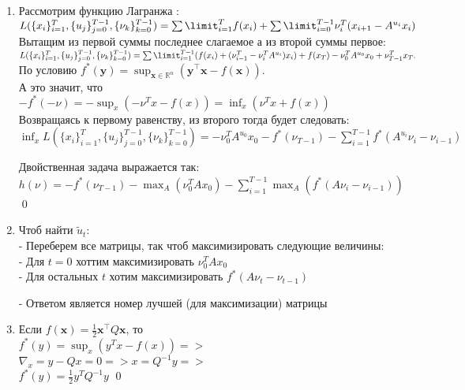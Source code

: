 \documentclass[a4paper,12pt]{article}
\begin{document}
\begin{enumerate}
    \item Рассмотрим функцию Лагранжа : \\
    $L(\{x_i\}_{i=1}^T, \{u_j\}_{j=0}^{T-1}, \{ \nu_k\}_{k=0}^{T-1} ) = \sum \limit_{i=1}^T f(x_i) + \sum \limit_{i=0}^{T-1} \nu_i^T(x_{i+1} - A^{u_i}x_i)$ \\

    Вытащим из первой суммы последнее слагаемое а из второй суммы первое:\\
    $L(\{x_i\}_{i=1}^T, \{u_j\}_{j=0}^{T-1}, \{ \nu_k\}_{k=0}^{T-1}) = \sum \limit_{i=1}^{T-1} (f(x_i) + (\nu_{i-1}^T - \nu_i^T A^{u_i})x_i) + f(x_T) - \nu_0^T A^{u_0}x_0 + \nu_{T-1}^T x_T.$ \\

    По условию $f^*(\mathbf{y})=\sup_{\mathbf{x}\in\mathbb{R}^n}\left(\mathbf{y}^\top \mathbf{x}-f(\mathbf{x})\right).$\\
    А это значит, что $-f^*(-\nu) = - \sup_{x}(-\nu^Tx - f(x)) = \inf_{x}(\nu^T x + f(x))$\\

    Возвращаясь к первому равенству, из второго тогда будет следовать:\\
    $\inf_{x}L(\{x_i\}_{i=1}^T, \{u_j\}_{j=0}^{T-1}, \{ \nu_k\}_{k=0}^{T-1} ) = - \nu_0^T A^{u_0}x_0 - f^*(\nu_{T-1}) - \sum \limits_{i=1}^{T-1} f^*(A^{u_i}\nu_i - \nu_{i-1})$

    Двойственная задача выражается так:\\
    $h(\nu) = - f^*(\nu_{T-1}) -\max_{A}(\nu_0^T Ax_0) - \sum \limits_{i=1}^{T-1} \max_{A}(f^*(A\nu_i - \nu_{i-1})) $ \qed

    \item Чтоб найти $\tilde{u}_t:$\\
    - Переберем все матрицы, так чтоб максимизировать следующие величины:\\
        - Для $t = 0$ хоттим максимизировать $\nu_0^T Ax_0$\\
        - Для остальных $t$ хотим максимизировать $f^*(A\nu_t - \nu_{t-1})$

    - Ответом является номер лучшей (для максимизации) матрицы

    \item  Если $f(\mathbf{x})=\frac{1}{2}\mathbf{x}^\top Q \mathbf{x}$, то \\
    $f^*(y) = \sup_{x} (y^Tx - f(x)) =>$\\

    $\nabla_x = y - Qx = 0 => x = Q^{-1}y =>$\\

    $f^*(y) = \frac{1}{2}y^TQ^{-1}y$ \qed
    
    
\end{enumerate}
\end{document}
